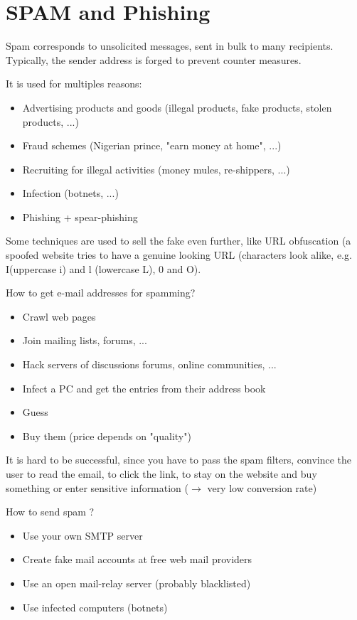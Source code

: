 \chapter{SPAM and Phishing}

Spam corresponds to unsolicited messages, sent in bulk to many recipients. Typically, the sender address is forged to prevent counter measures.

It is used for multiples reasons:
\begin{itemize}
    \item Advertising products and goods (illegal products, fake products, stolen products, ...)
    \item Fraud schemes (Nigerian prince, "earn money at home", ...)
    \item Recruiting for illegal activities (money mules, re-shippers, ...)
    \item Infection (botnets, ...)
    \item Phishing + spear-phishing
\end{itemize}

Some techniques are used to sell the fake even further, like URL obfuscation (a spoofed website tries to have a genuine looking URL (characters look alike, e.g. I(uppercase i) and l (lowercase L), 0 and O).

How to get e-mail addresses for spamming?
\begin{itemize}
    \item Crawl web pages
    \item Join mailing lists, forums, ...
    \item Hack servers of discussions forums, online communities, ...
    \item Infect a PC and get the entries from their address book
    \item Guess
    \item Buy them (price depends on "quality")
\end{itemize}

It is hard to be successful, since you have to pass the spam filters, convince the user to read the email, to click the link, to stay on the website and buy something or enter sensitive information ($\rightarrow$ very low conversion rate)

How to send spam ?
\begin{itemize}
    \item Use your own SMTP server
    \item Create fake mail accounts at free web mail providers
    \item Use an open mail-relay server (probably blacklisted)
    \item Use infected computers (botnets)
\end{itemize}

